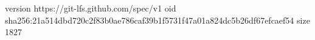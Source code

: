 version https://git-lfs.github.com/spec/v1
oid sha256:21a514dbd720c2f83b0ae786caf39b1f5731f47a01a824dc5b26df67efcaef54
size 1827
